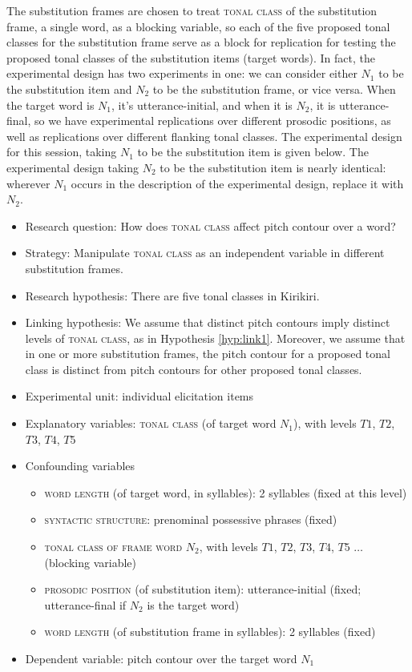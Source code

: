 \documentclass[12pt]{article}
\begin{document}
The substitution frames are chosen to treat
\textsc{tonal class} of the substitution frame, a single word, as a
blocking variable, so each of the five proposed tonal classes for the
substitution frame serve as a block for replication for testing the
proposed tonal classes of the substitution items (target words). In
fact, the experimental design has two experiments in one: we can consider
either $N_1$ to be the substitution item and $N_2$ to be the
substitution frame, or vice versa. When the target word is $N_1$, it's
utterance-initial, and when it is $N_2$, it is utterance-final, so we
have experimental replications over different prosodic positions, as
well as replications over different flanking tonal classes. The experimental design for this
session, taking $N_1$ to be the substitution item is given below. The
experimental design taking $N_2$ to be the substitution item is nearly
identical: wherever $N_1$ occurs in the description of the
experimental design, replace it with $N_2$.

\begin{itemize}
  \item Research question: How does \textsc{tonal class} affect pitch
    contour over a word?
  \item Strategy: Manipulate \textsc{tonal class} as an independent
    variable in different substitution frames. 
  \item Research hypothesis: There are five tonal classes in Kirikiri.
  \item Linking hypothesis: We assume that distinct pitch contours
    imply distinct levels of \textsc{tonal class}, as in Hypothesis
    \ref{hyp:link1}. Moreover, we assume that in one or more substitution frames, the
    pitch contour for a proposed tonal class is distinct from pitch
    contours for other proposed tonal classes.
  \item Experimental unit: individual elicitation items
  \item Explanatory variables: \textsc{tonal class} (of target word $N_1$), with levels $T1$, $T2$, $T3$,
  $T4$, $T5$
  \item Confounding variables
  \begin{itemize}
    \item \textsc{word length} (of target word, in syllables): 2 syllables (fixed at this
    level)
    \item \textsc{syntactic structure}: prenominal possessive phrases (fixed)  
    \item \textsc{tonal class of frame word} $N_2$, with levels $T1$, $T2$, $T3$,
  $T4$, $T5$ $\ldots$ (blocking variable)
    \item \textsc{prosodic position} (of substitution item):
      utterance-initial (fixed; utterance-final if $N_2$ is the target
      word)
    \item \textsc{word length} (of substitution frame in syllables): 2
      syllables (fixed)
  \end{itemize}
  \item Dependent variable: pitch contour over the target word $N_1$
\end{itemize}
\end{document}
